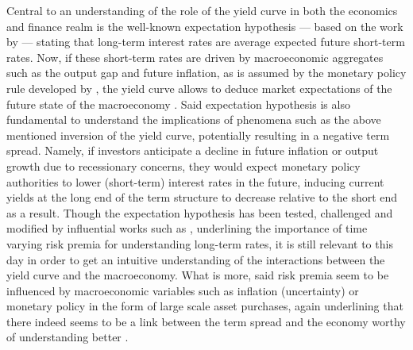 Central to an understanding of the role of the yield curve in both the economics and finance realm is the well-known expectation hypothesis --- based on the work by \citet{hicks1946value} --- stating that long-term interest rates are average expected future short-term rates. 
Now, if these short-term rates are driven by macroeconomic aggregates such as the output gap and future inflation, as is assumed by the monetary policy rule developed by \citet{taylor1993discretion}, the yield curve allows to deduce market expectations of the future state of the macroeconomy \citep{Gürkaynak_Wright_2012}. 
Said expectation hypothesis is also fundamental to understand the implications of phenomena such as the above mentioned inversion of the yield curve, potentially resulting in a negative term spread.
Namely, if investors anticipate a decline in future inflation or output growth due to recessionary concerns, they would expect monetary policy authorities to lower (short-term) interest rates in the future, inducing current yields at the long end of the term structure to decrease relative to the short end as a result. 
Though the expectation hypothesis has been tested, challenged and modified by influential works such as \citet{campbell1991yield}, underlining the importance of time varying risk premia for understanding long-term rates, it is still relevant to this day in order to  get an intuitive understanding of the interactions between the yield curve and the macroeconomy.
What is more, said risk premia seem to be influenced by macroeconomic variables such as inflation (uncertainty) or monetary policy in the form of large scale asset purchases, again underlining that there indeed seems to be a link between the term spread and the economy worthy of understanding better \citep{Gürkaynak_Wright_2012}. 


